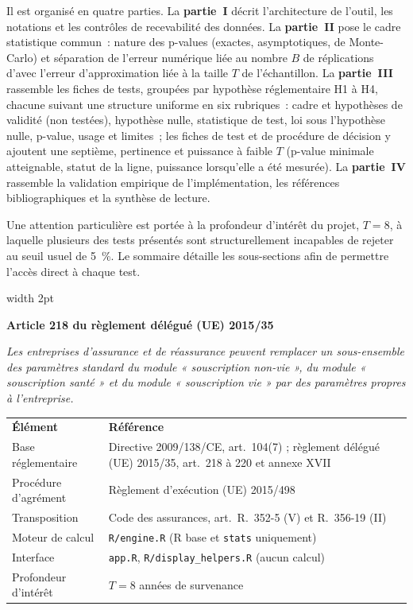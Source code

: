 \documentclass[a4paper,11pt]{article}
\newcommand{\code}[1]{\texttt{\small #1}}
\newcommand{\reglement}[2]{%
  \par\vspace{2mm}\noindent\begin{minipage}{\linewidth}
  \small\setlength{\parindent}{0pt}
  \textcolor{financeblue}{\vrule width 2pt}\hspace{4mm}%
  \begin{minipage}{\dimexpr\linewidth-7mm\relax}
  \textcolor{financeblue}{\textbf{#1}}
  \par\vspace{2pt}
  {\itshape #2}
  \end{minipage}
  \end{minipage}\par\vspace{3mm}}
\begin{document}
\medskip\noindent
Il est organisé en quatre parties. La \textbf{partie~I} décrit l'architecture de
l'outil, les notations et les contrôles de recevabilité des données. La
\textbf{partie~II} pose le cadre statistique commun~: nature des p-values
(exactes, asymptotiques, de Monte-Carlo) et séparation de l'erreur numérique
liée au nombre $B$ de réplications d'avec l'erreur d'approximation liée à la
taille $T$ de l'échantillon. La \textbf{partie~III} rassemble les fiches de
tests, groupées par hypothèse réglementaire H1 à H4, chacune suivant une
structure uniforme en six rubriques~: cadre et hypothèses de validité (non
testées), hypothèse nulle, statistique de test, loi sous l'hypothèse nulle,
p-value, usage et limites~; les fiches de test et de procédure de décision y
ajoutent une septième, pertinence et puissance à faible $T$ (p-value minimale
atteignable, statut de la ligne, puissance lorsqu'elle a été mesurée). La \textbf{partie~IV} rassemble la validation
empirique de l'implémentation, les références bibliographiques et la synthèse
de lecture.

\medskip\noindent
Une attention particulière est portée à la profondeur d'intérêt du projet,
$T = 8$, à laquelle plusieurs des tests présentés sont structurellement
incapables de rejeter au seuil usuel de 5~\%. Le sommaire détaille les
sous-sections afin de permettre l'accès direct à chaque test.

\vspace{8mm}
\reglement{Article 218 du règlement délégué (UE) 2015/35}{Les entreprises
d'assurance et de réassurance peuvent remplacer un sous-ensemble des paramètres
standard du module « souscription non-vie », du module « souscription santé » et
du module « souscription vie » par des paramètres propres à l'entreprise.}

\vspace{6mm}
\noindent
\begin{center}
\small
{}
\begin{tabular}{@{}p{5.2cm}p{9.6cm}@{}}
\rowcolor{tableheader}
\textcolor{financeblue}{\textbf{Élément}} & \textcolor{financeblue}{\textbf{Référence}} \\
Base réglementaire & Directive 2009/138/CE, art.~104(7) ; règlement délégué
(UE) 2015/35, art.~218 à 220 et annexe XVII \\
Procédure d'agrément & Règlement d'exécution (UE) 2015/498 \\
Transposition & Code des assurances, art.~R.~352-5 (V) et R.~356-19 (II) \\
Moteur de calcul & \code{R/engine.R} (R base et \code{stats} uniquement) \\
Interface & \code{app.R}, \code{R/display\_helpers.R} (aucun calcul) \\
Profondeur d'intérêt & $T = 8$ années de survenance \\
\end{tabular}
\end{center}
\end{document}
